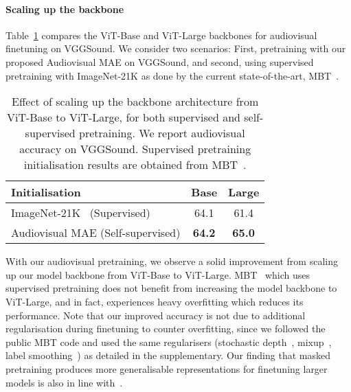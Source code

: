 \documentclass[10pt,twocolumn,letterpaper]{article}
\def \paravspace {-1\baselineskip}
\begin{document}
\vspace{\paravspace}
\paragraph{Scaling up the backbone}

Table~\ref{tab:ablation_model_size} compares the ViT-Base and ViT-Large backbones for audiovisual finetuning on VGGSound.
We consider two scenarios: First, pretraining with our proposed Audiovisual MAE on VGGSound, and second, using supervised pretraining with ImageNet-21K as done by the current state-of-the-art, MBT~\cite{nagrani2021attention}.


\begin{table}[t]
	\vspace{-0.1\baselineskip}
	\caption{
		Effect of scaling up the backbone architecture from ViT-Base to ViT-Large, for both supervised and self-supervised pretraining.
		We report audiovisual accuracy on VGGSound.
		Supervised pretraining initialisation results are obtained from MBT~\cite{nagrani2021attention}.
	}
	\vspace{-0.6\baselineskip}
	\centering
	\begin{tabular}{l cc}
		\toprule
		Initialisation & Base & Large \\
		\midrule
		ImageNet-21K~\cite{nagrani2021attention} (Supervised)    & 64.1   & 61.4     \\
		Audiovisual MAE (Self-supervised)  & \textbf{64.2}   & \textbf{65.0}    \\
		\bottomrule
	\end{tabular}
	\label{tab:ablation_model_size}
	\vspace{-1.25\baselineskip}
\end{table} 

With our audiovisual pretraining, we observe a solid improvement from scaling up our model backbone from ViT-Base to ViT-Large. MBT~\cite{nagrani2021attention}	which uses supervised pretraining does not benefit from increasing the model backbone to ViT-Large, and in fact, experiences heavy overfitting which reduces its performance.
Note that our improved accuracy is not due to additional regularisation during finetuning to counter overfitting, since we followed the public MBT code and used the same regularisers (stochastic depth~\cite{huang_stochasticdepth_eccv_2016}, mixup~\cite{zhang_mixup_iclr_2018}, label smoothing~\cite{szegedy_cvpr_2016}) as detailed in the supplementary.
Our finding that masked pretraining produces more generalisable representations for finetuning larger models is also in line with~\cite{he2022masked}.
\end{document}
